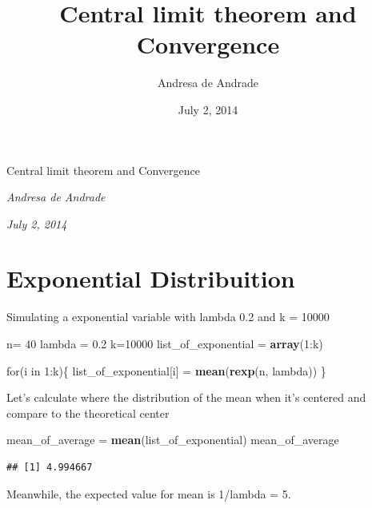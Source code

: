 \documentclass[]{article}
\title{Central limit theorem and Convergence}
\author{Andresa de Andrade}
\date{July 2, 2014}
\newenvironment{Shaded}{\begin{snugshade}}{\end{snugshade}}
\newcommand{\KeywordTok}[1]{\textcolor[rgb]{0.13,0.29,0.53}{\textbf{{#1}}}}
\newcommand{\DecValTok}[1]{\textcolor[rgb]{0.00,0.00,0.81}{{#1}}}
\newcommand{\FloatTok}[1]{\textcolor[rgb]{0.00,0.00,0.81}{{#1}}}
\newcommand{\StringTok}[1]{\textcolor[rgb]{0.31,0.60,0.02}{{#1}}}
\newcommand{\NormalTok}[1]{{#1}}
\begin{document}
\begin{center}
\huge Central limit theorem and Convergence \\[0.2cm]
\end{center}
\begin{center}
\large \emph{Andresa de Andrade}\\[0.1cm]
\end{center}
\begin{center}
\large \emph{July 2, 2014} \\
\end{center}
\normalsize


{
\hypersetup{linkcolor=black}
\setcounter{tocdepth}{2}
\tableofcontents
}
\newpage 

\section{Exponential Distribuition}\label{exponential-distribuition}

Simulating a exponential variable with lambda 0.2 and k = 10000

\begin{Shaded}
\begin{Highlighting}[]
\NormalTok{n=}\StringTok{ }\DecValTok{40}
\NormalTok{lambda =}\StringTok{ }\FloatTok{0.2}
\NormalTok{k=}\DecValTok{10000}
\NormalTok{list_of_exponential =}\StringTok{ }\KeywordTok{array}\NormalTok{(}\DecValTok{1}\NormalTok{:k)}

\NormalTok{for(i in }\DecValTok{1}\NormalTok{:k)\{}
  \NormalTok{list_of_exponential[i] =}\StringTok{ }\KeywordTok{mean}\NormalTok{(}\KeywordTok{rexp}\NormalTok{(n, lambda))}
\NormalTok{\}}
\end{Highlighting}
\end{Shaded}

Let's calculate where the distribution of the mean when it's centered
and compare to the theoretical center

\begin{Shaded}
\begin{Highlighting}[]
\NormalTok{mean_of_average =}\StringTok{ }\KeywordTok{mean}\NormalTok{(list_of_exponential)}
\NormalTok{mean_of_average}
\end{Highlighting}
\end{Shaded}

\begin{verbatim}
## [1] 4.994667
\end{verbatim}

Meanwhile, the expected value for mean is 1/lambda = 5.
\end{document}
